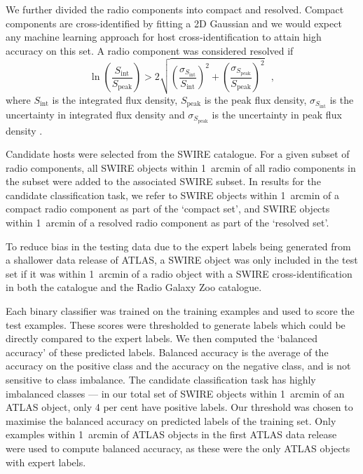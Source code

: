     We further divided the radio components into compact and resolved. Compact
    components are cross-identified by fitting a 2D Gaussian \citep[as
    in][]{norris06} and we would expect any machine learning approach for host
    cross-identification to attain high accuracy on this set. A radio component was
    considered resolved if
    \begin{equation}
      \label{eq:atlas-compact}
        \ln \left(
          \frac{S_{\text{int}}}
               {S_{\text{peak}}}
        \right) > 2\sqrt{\left(
          \frac{\sigma_{S_{\text{int}}}}
               {S_{\text{int}}}
        \right)^2 + \left(
          \frac{\sigma_{S_{\text{peak}}}}
               {S_{\text{peak}}}
        \right)^2}\,\,\,\,,
    \end{equation}%
    where \(S_{\text{int}}\) is the integrated flux density,
    \(S_{\text{peak}}\) is the peak flux density, {$\sigma_{S_{\text{int}}}$ is
    the uncertainty in integrated flux density and $\sigma_{S_{\text{peak}}}$
    is the uncertainty in peak flux density} \citep[following][]{franzen15}.

    Candidate hosts were selected from the SWIRE catalogue. For a given subset
    of radio components, all SWIRE objects within 1~arcmin of all radio
    components in the subset were added to the associated SWIRE subset. In results
    for the candidate classification task, we refer to SWIRE objects
    within 1~arcmin of a compact radio component as part of the `compact set',
    and SWIRE objects within 1~arcmin of a resolved radio component as part of
    the `resolved set'.

    To reduce bias in the testing data due to the expert labels being
    generated from a shallower data release of ATLAS, a SWIRE object was only
    included in the test set if it was within 1~arcmin of a radio object with
    a SWIRE cross-identification in both the \citet{norris06} catalogue and the
    Radio Galaxy Zoo catalogue.

    Each binary classifier was trained on the training examples and used to
    {score the test examples. These scores were thresholded to generate labels which could be directly compared
    to the expert labels. We then computed the `balanced accuracy' of these predicted labels.} Balanced
    accuracy is the average of the accuracy on the positive class and the
    accuracy on the negative class, and is not sensitive to class imbalance.
    The candidate classification task has highly imbalanced classes --- in our
    total set of SWIRE objects within 1~arcmin of an ATLAS object, only 4 per
    cent have positive labels. {Our threshold was chosen to maximise the balanced
    accuracy on predicted labels of the training set.} Only examples within 1~arcmin of ATLAS objects
    in the first ATLAS data release \citep{norris06} were used to compute
    balanced accuracy, as these were the only ATLAS objects with expert labels.

